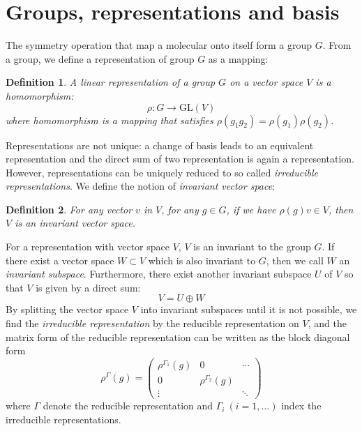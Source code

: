 \documentclass{article}
\newtheorem{definition}{Definition}
\begin{document}
\section{Groups, representations and basis}
The symmetry operation that map a molecular onto itself form a group $G$. From a group,
we define a representation of group $G$ as a mapping:
\begin{definition}
    A linear \emph{representation} of a group $G$ on a vector space $V$ is a homomorphism:
    \[\rho\colon G \to \text{GL}(V)\]
    where homomorphism is a mapping that satisfies $\rho(g_1g_2) = \rho(g_1)\rho(g_2)$.
\end{definition}
Representations are not unique: a change of basis leads to an equivalent representation 
and the direct sum of two representation is again a representation. However, representations
can be uniquely reduced to so called \emph{irreducible representations}.
We define the notion of \emph{invariant vector space}:
\begin{definition}
    For any vector $v$ in $V$, for any $g\in G$, if we have $\rho(g)v \in V$, then $V$
    is an invariant vector space.
\end{definition} 
For a representation with vector space $V$, $V$ is an invariant to the group $G$. 
If there exist a vector space $W\subset V$ which is also invariant to $G$, then we call $W$
an \emph{invariant subspace}. 
Furthermore, there exist another invariant subspace $U$ of $V$ so that $V$ is given by a direct sum:
\begin{equation}
    V = U \oplus W
\end{equation}
By splitting the vector space $V$ into invariant subspaces until it is not possible, we find the 
\emph{irreducible representation} by the reducible representation on $V$, and the matrix form 
of the reducible representation can be written as the block diagonal form
\begin{equation}
    \rho^{\Gamma}(g) = \left(  
        \begin{matrix}
            \rho^{\Gamma_1} (g) & 0 & \cdots\\
            0 & \rho^{\Gamma_2} (g) & \\
            \vdots &  & \ddots
        \end{matrix}
    \right)
\end{equation}
where $\Gamma$ denote the reducible representation and $\Gamma_i\ (i = 1, \dots)$ index 
the irreducible representations.

\begin{thebibliography}{99}
    \bibitem{} 
\end{thebibliography}

\appendix 
\section{}
\end{document}
